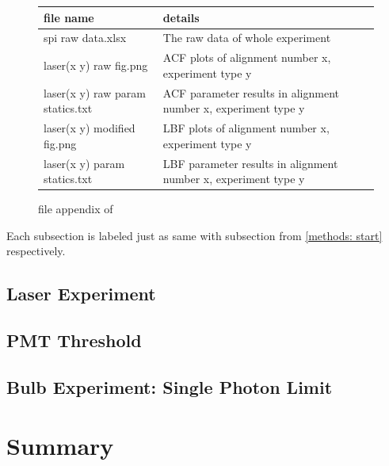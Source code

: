 \documentclass{article}
\begin{document}
\begin{figure}[H]
    \begin{tabular}{  m{5.2cm} | m{8.7cm} } 

      file name& details \\ 
      \hline
      \hline
        spi raw data.xlsx & The raw data of whole experiment\\
      \hline
        laser(x y) raw fig.png & ACF plots of alignment number x, experiment type y\\
      \hline
        laser(x y) raw param statics.txt & ACF parameter results in alignment number x, experiment type y\\
      \hline
        laser(x y) modified fig.png & LBF plots of alignment number x, experiment type y\\
      \hline
        laser(x y) param statics.txt & LBF parameter results in alignment number x, experiment type y
    \end{tabular}
    \caption{file appendix of \cite{github}}
    \label{fig: file_appendix}
\end{figure}

Each subsection is labeled just as same with subsection from \ref{methods: start} respectively.
\subsection{Laser Experiment}

\subsection{PMT Threshold}

\subsection{Bulb Experiment: Single Photon Limit}

\section{Summary}






\end{document}

